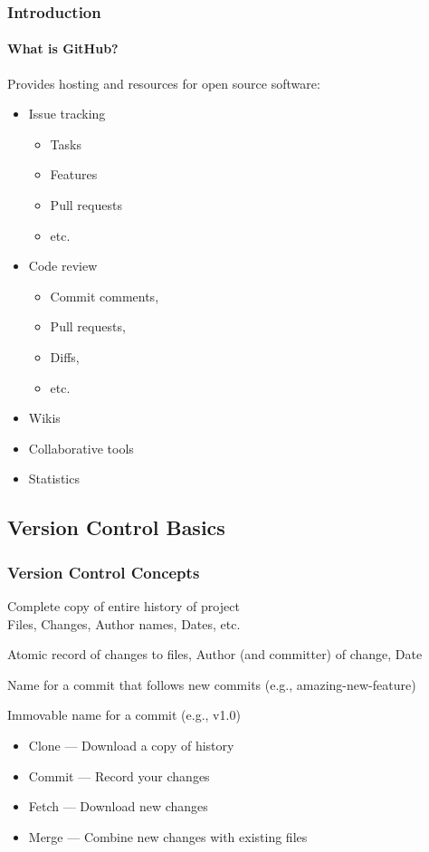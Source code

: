 \begin{frame}
 \frametitle{Introduction}
 \framesubtitle{What is GitHub?}

 Provides hosting and resources for open source software:
 \begin{itemize}
  \item Issue tracking
   \begin{itemize}
    \item Tasks
    \item Features
    \item Pull requests
    \item etc.
   \end{itemize}
  \item Code review
   \begin{itemize}
    \item Commit comments,
    \item Pull requests,
    \item Diffs,
    \item etc.
   \end{itemize}
  \item Wikis
  \item Collaborative tools
  \item Statistics
 \end{itemize}
\end{frame}

\subsection{Version Control Basics}

\begin{frame}
 \frametitle{Version Control Concepts}

 \begin{description}[Operations]
  \item[Repository] Complete copy of entire history of project\\
                    Files, Changes, Author names, Dates, etc.
  \item[Commit] Atomic record of changes to files, Author (and committer) of
                change, Date
  \item[Branch] Name for a commit that follows new commits (e.g.,
                amazing-new-feature)
  \item[Tag] Immovable name for a commit (e.g., v1.0)
  \item[Operations]
   \begin{itemize}
    \item Clone --- Download a copy of history
    \item Commit --- Record your changes
    \item Fetch --- Download new changes
    \item Merge --- Combine new changes with existing files
   \end{itemize}
 \end{description}
\end{frame}

